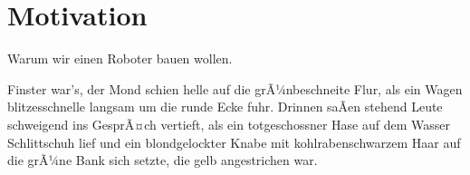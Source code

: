\renewcommand{\autoren}{Aleksandar Stoiljkovic}

\section{Motivation}
Warum wir einen Roboter bauen wollen.
\par\bigskip
Finster war's, der Mond schien helle auf die grÃ¼nbeschneite Flur, als
ein Wagen blitzesschnelle langsam um die runde Ecke fuhr. Drinnen
saÃen stehend Leute schweigend ins GesprÃ¤ch vertieft, als ein
totgeschossner Hase auf dem Wasser Schlittschuh lief und ein
blondgelockter Knabe mit kohlrabenschwarzem Haar auf die grÃ¼ne Bank
sich setzte, die gelb angestrichen war.
\newpage
